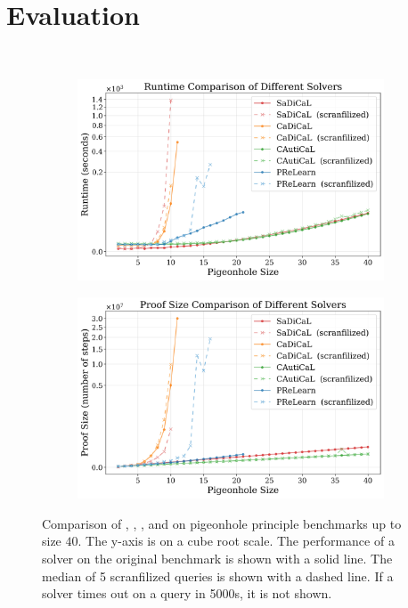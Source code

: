 \section{Evaluation}~\label{sec:evaluation}

\begin{figure}[!t]
    \centering
    \begin{subfigure}[t]{0.4\textwidth}
        \centering
        \includegraphics[width=\textwidth]{figs/pigeonhole_runtime_comparison.jpg}
        \label{fig:pigeonhole-runtime-comparison}
    \end{subfigure}
    \hspace{0.06\textwidth}
    \begin{subfigure}[t]{0.4\textwidth}
        \centering
        \includegraphics[width=\textwidth]{figs/pigeonhole_proof_size_comparison.jpg}
        \label{fig:pigeonhole-proof-size-comparison}
    \end{subfigure}
    \caption{Comparison of \tool, \cadical, \sadical, and \prelearn on pigeonhole principle benchmarks up to size $40$. The y-axis is on a cube root scale. The performance of a solver on the original benchmark is shown with a solid line. The median of 5 scranfilized queries is shown with a dashed line. If a solver times out on a query in 5000s, it is not shown.}
    \label{fig:pigeonhole-results}
\end{figure}

